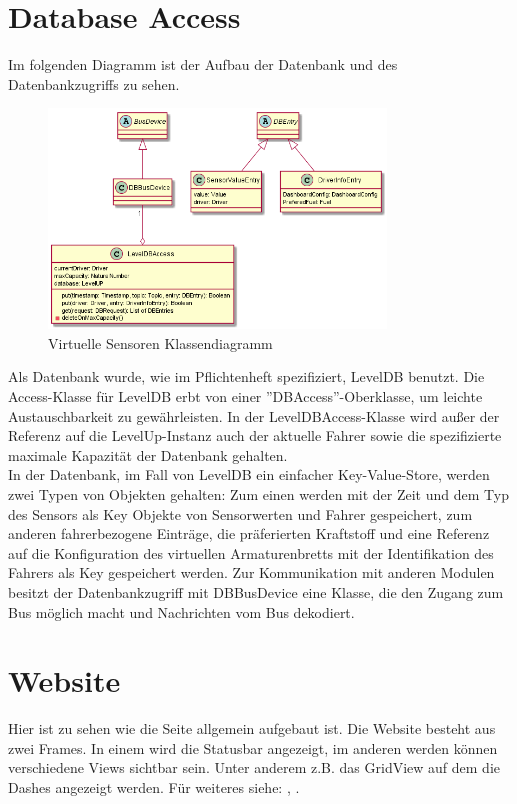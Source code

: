 \documentclass[entwurf.tex]{subfiles}
\begin{document}
  	\section{Database Access}
  		Im folgenden Diagramm ist der Aufbau der Datenbank und des Datenbankzugriffs zu sehen.
  		\begin{figure}[H]
  			\begin{center}
 				\includegraphics[width=0.8\textwidth]{diagrams/DBAccess.png}
  				\caption{Virtuelle Sensoren Klassendiagramm}
  			\end{center}
  		\end{figure}
  	Als Datenbank wurde, wie im Pflichtenheft spezifiziert, LevelDB benutzt. Die Access-Klasse für LevelDB erbt von einer ''DBAccess''-Oberklasse, um leichte Austauschbarkeit zu gewährleisten. In der LevelDBAccess-Klasse wird außer der Referenz auf die LevelUp-Instanz auch der aktuelle Fahrer sowie die spezifizierte maximale Kapazität der Datenbank gehalten. \\ In der Datenbank, im Fall von LevelDB ein einfacher Key-Value-Store, werden zwei Typen von Objekten gehalten: Zum einen werden mit der Zeit und dem Typ des Sensors als Key Objekte von Sensorwerten und Fahrer gespeichert, zum anderen fahrerbezogene Einträge, die präferierten Kraftstoff und eine Referenz auf die Konfiguration des virtuellen Armaturenbretts mit der Identifikation des Fahrers als Key gespeichert werden. Zur Kommunikation mit anderen Modulen besitzt der Datenbankzugriff mit DBBusDevice eine Klasse, die den Zugang zum Bus möglich macht und Nachrichten vom Bus dekodiert. 
  	

	\newpage
  	\section{Website}
  	\label{Class:Website}
		Hier ist zu sehen wie die Seite allgemein aufgebaut ist. Die Website besteht aus zwei Frames. In einem wird die Statusbar angezeigt, im anderen werden können verschiedene Views sichtbar sein. Unter anderem z.B. das GridView auf dem die Dashes angezeigt werden. Für weiteres siehe: , .
		
\end{document}
